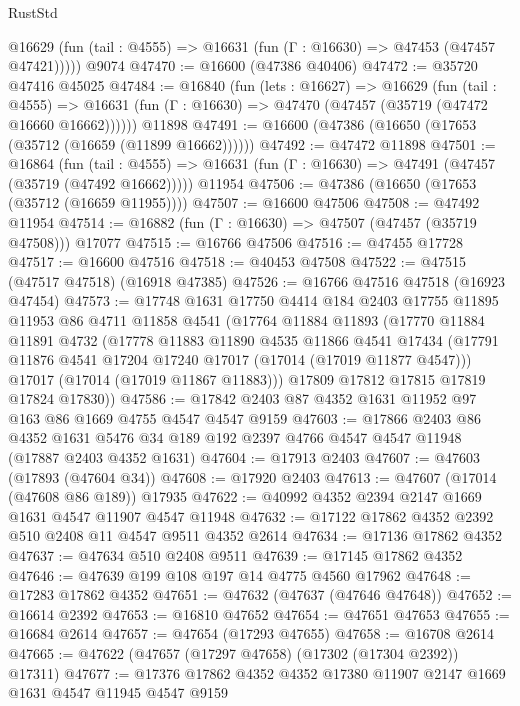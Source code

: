 \begin{lexlean}{RustStd}
\begin{coremodule}
      @16629 (fun (tail : @4555) => @16631 (fun (Γ : @16630) => @47453 (@47457 @47421)))))
    @9074
@47470 := @16600 (@47386 @40406)
@47472 := @35720 @47416 @45025
@47484 := @16840
    (fun (lets : @16627) =>
    @16629
      (fun (tail : @4555) =>
      @16631 (fun (Γ : @16630) => @47470 (@47457 (@35719 (@47472 @16660 @16662))))))
    @11898
@47491 := @16600 (@47386 (@16650 (@17653 (@35712 (@16659 (@11899 @16662))))))
@47492 := @47472 @11898
@47501 := @16864
    (fun (tail : @4555) => @16631 (fun (Γ : @16630) => @47491 (@47457 (@35719 (@47492 @16662)))))
    @11954
@47506 := @47386 (@16650 (@17653 (@35712 (@16659 @11955))))
@47507 := @16600 @47506
@47508 := @47492 @11954
@47514 := @16882 (fun (Γ : @16630) => @47507 (@47457 (@35719 @47508))) @17077
@47515 := @16766 @47506
@47516 := @47455 @17728
@47517 := @16600 @47516
@47518 := @40453 @47508
@47522 := @47515 (@47517 @47518) (@16918 @47385)
@47526 := @16766 @47516 @47518 (@16923 @47454)
@47573 := @17748
    @1631
    @17750
    @4414
    @184
    @2403
    @17755
    @11895
    @11953
    @86
    @4711
    @11858
    @4541
    (@17764
      @11884
      @11893
      (@17770
        @11884
        @11891
        @4732
        (@17778
          @11883
          @11890
          @4535
          @11866
          @4541
          @17434
          (@17791 @11876 @4541 @17204 @17240 @17017 (@17014 (@17019 @11877 @4547)))
          @17017
          (@17014 (@17019 @11867 @11883)))
        @17809
        @17812
        @17815
        @17819
        @17824
        @17830))
@47586 := @17842 @2403 @87 @4352 @1631 @11952 @97 @163 @86 @1669 @4755 @4547 @4547 @9159
@47603 := @17866
    @2403
    @86
    @4352
    @1631
    @5476
    @34
    @189
    @192
    @2397
    @4766
    @4547
    @4547
    @11948
    (@17887 @2403 @4352 @1631)
@47604 := @17913 @2403
@47607 := @47603 (@17893 (@47604 @34))
@47608 := @17920 @2403
@47613 := @47607 (@17014 (@47608 @86 @189)) @17935
@47622 := @40992 @4352 @2394 @2147 @1669 @1631 @4547 @11907 @4547 @11948
@47632 := @17122 @17862 @4352 @2392 @510 @2408 @11 @4547 @9511 @4352 @2614
@47634 := @17136 @17862 @4352
@47637 := @47634 @510 @2408 @9511
@47639 := @17145 @17862 @4352
@47646 := @47639 @199 @108 @197 @14 @4775 @4560 @17962
@47648 := @17283 @17862 @4352
@47651 := @47632 (@47637 (@47646 @47648))
@47652 := @16614 @2392
@47653 := @16810 @47652
@47654 := @47651 @47653
@47655 := @16684 @2614
@47657 := @47654 (@17293 @47655)
@47658 := @16708 @2614
@47665 := @47622 (@47657 (@17297 @47658) (@17302 (@17304 @2392)) @17311)
@47677 := @17376 @17862 @4352 @4352 @17380 @11907 @2147 @1669 @1631 @4547 @11945 @4547 @9159

\end{coremodule}
\end{lexlean}
